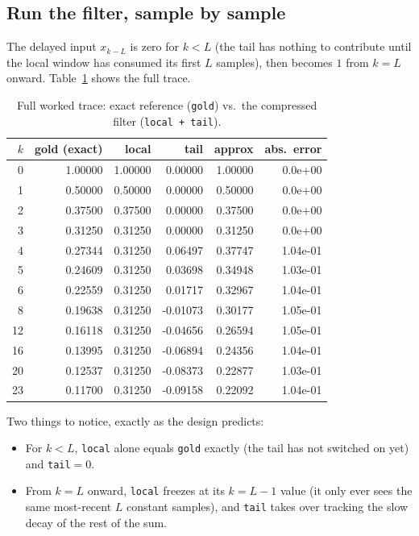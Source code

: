 \documentclass[11pt]{article}
\begin{document}
\subsection{Run the filter, sample by sample}
The delayed input $x_{k-L}$ is zero for $k<L$ (the tail has nothing to contribute until the local window has consumed its first $L$ samples), then becomes $1$ from $k=L$ onward. Table~\ref{tab:trace} shows the full trace.

\begin{table}[h]
\centering
\caption{Full worked trace: exact reference (\texttt{gold}) vs.\ the compressed filter (\texttt{local + tail}).}
\label{tab:trace}
\small
\begin{tabular}{rrrrrr}
\toprule
$k$ & gold (exact) & local & tail & approx & abs.\ error \\
\midrule
0  & 1.00000 & 1.00000 & 0.00000 & 1.00000 & 0.0e+00 \\
1  & 0.50000 & 0.50000 & 0.00000 & 0.50000 & 0.0e+00 \\
2  & 0.37500 & 0.37500 & 0.00000 & 0.37500 & 0.0e+00 \\
3  & 0.31250 & 0.31250 & 0.00000 & 0.31250 & 0.0e+00 \\
4  & 0.27344 & 0.31250 & 0.06497 & 0.37747 & 1.04e-01 \\
5  & 0.24609 & 0.31250 & 0.03698 & 0.34948 & 1.03e-01 \\
6  & 0.22559 & 0.31250 & 0.01717 & 0.32967 & 1.04e-01 \\
8  & 0.19638 & 0.31250 & -0.01073 & 0.30177 & 1.05e-01 \\
12 & 0.16118 & 0.31250 & -0.04656 & 0.26594 & 1.05e-01 \\
16 & 0.13995 & 0.31250 & -0.06894 & 0.24356 & 1.04e-01 \\
20 & 0.12537 & 0.31250 & -0.08373 & 0.22877 & 1.03e-01 \\
23 & 0.11700 & 0.31250 & -0.09158 & 0.22092 & 1.04e-01 \\
\bottomrule
\end{tabular}
\end{table}

Two things to notice, exactly as the design predicts:
\begin{itemize}
\item For $k<L$, \texttt{local} alone equals \texttt{gold} exactly (the tail has not switched on yet) and \texttt{tail}$=0$.
\item From $k=L$ onward, \texttt{local} freezes at its $k{=}L{-}1$ value (it only ever sees the same most-recent $L$ constant samples), and \texttt{tail} takes over tracking the slow decay of the rest of the sum.
\end{itemize}
\end{document}

